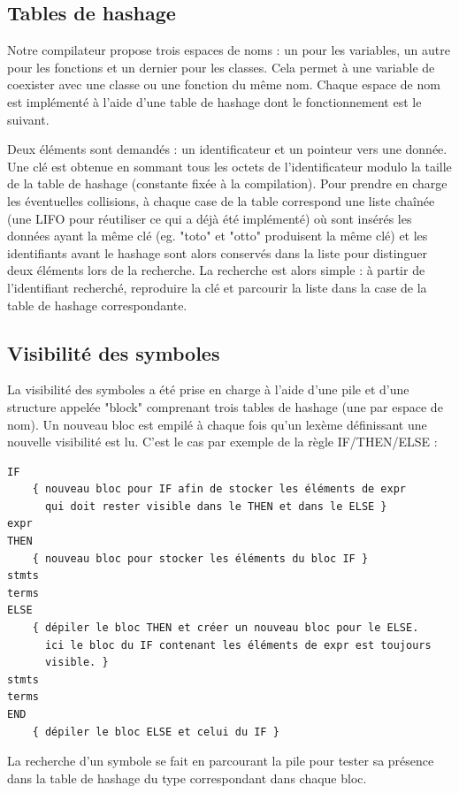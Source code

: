 \documentclass[12pt]{article}
\begin{document}
\subsection{Tables de hashage}

Notre compilateur propose trois espaces de noms : un pour les
variables, un autre pour les fonctions et un dernier pour les classes. Cela
permet à une variable de coexister avec une classe ou une fonction du même
nom. Chaque espace de nom est implémenté à l'aide d'une table de hashage dont
le fonctionnement est le suivant.

Deux éléments sont demandés : un identificateur et un pointeur vers une donnée.
Une clé est obtenue en sommant tous les octets de l'identificateur modulo la
taille de la table de hashage (constante fixée à la compilation). Pour prendre
en charge les éventuelles collisions, à chaque case de la table correspond une
liste chaînée (une LIFO pour réutiliser ce qui a déjà été implémenté) où sont
insérés les données ayant la même clé (eg. "toto" et "otto" produisent la même
clé) et les identifiants avant le hashage sont alors conservés dans la liste
pour distinguer deux éléments lors de la recherche. La recherche est alors
simple : à partir de l'identifiant recherché, reproduire la clé et parcourir
la liste dans la case de la table de hashage correspondante.


\subsection{Visibilité des symboles}

La visibilité des symboles a été prise en charge à l'aide d'une pile et d'une
structure appelée "block" comprenant trois tables de hashage (une par espace
de nom). Un nouveau bloc est empilé à chaque fois qu'un lexème définissant une
nouvelle visibilité est lu. C'est le cas par exemple de la règle IF/THEN/ELSE
:

\begin{verbatim}
IF
    { nouveau bloc pour IF afin de stocker les éléments de expr
      qui doit rester visible dans le THEN et dans le ELSE }
expr
THEN
    { nouveau bloc pour stocker les éléments du bloc IF }
stmts
terms
ELSE
    { dépiler le bloc THEN et créer un nouveau bloc pour le ELSE.
      ici le bloc du IF contenant les éléments de expr est toujours
      visible. }
stmts
terms
END
    { dépiler le bloc ELSE et celui du IF }
\end{verbatim}


La recherche d'un symbole se fait en parcourant la pile pour
tester sa présence dans la table de hashage du type correspondant dans chaque
bloc.
\end{document}
